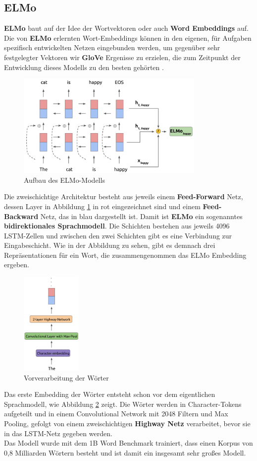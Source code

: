 \subsection{ELMo}
\textbf{ELMo} baut auf der Idee der Wortvektoren oder auch \textbf{Word Embeddings} auf. Die von \textbf{ELMo} erlernten Wort-Embeddings k\"onnen in den eigenen, f\"ur Aufgaben spezifisch entwickelten Netzen eingebunden werden, um gegen\"uber sehr festgelegter Vektoren wir \textbf{GloVe} Ergenisse zu erzielen, die zum Zeitpunkt der Entwicklung dieses Modells zu den besten geh\"orten \cite{elmo}.\\
\begin{figure}[!ht]
\centering
\includegraphics[height=5cm]{pics/elmo_layered_embeddings.png}
\caption{Aufbau des ELMo-Modells \cite{elmoex}}
\label{fig:elmo_layers}
\end{figure}
Die zweischichtige Architektur besteht aus jeweils einem \textbf{Feed-Forward} Netz, dessen Layer in Abbildung \ref{fig:elmo_layers} in rot eingezeichnet sind und einem \textbf{Feed-Backward} Netz, das in blau dargestellt ist. Damit ist \textbf{ELMo} ein sogenanntes \textbf{bidirektionales Sprachmodell}. Die Schichten bestehen aus jeweils 4096 LSTM-Zellen und zwischen den zwei Schichten gibt es eine Verbindung zur Eingabeschicht. Wie in der Abbildung zu sehen, gibt es demnach drei Repr\"asentationen f\"ur ein Wort, die zusammengenommen das ELMo Embedding ergeben.\\
\begin{figure}[!ht]
\centering
\includegraphics[height=5cm]{pics/elmo_character_token.png}
\caption{Vorverarbeitung der W\"orter \cite{elmoex}}
\label{fig:elmo_character}
\end{figure}
Das erste Embedding der W\"orter entsteht schon vor dem eigentlichen Sprachmodell, wie Abbildung \ref{fig:elmo_character} zeigt. Die W\"orter werden in Character-Tokens aufgeteilt und in einem Convolutional Network mit 2048 Filtern und Max Pooling, gefolgt von einem zweischichtigen \textbf{Highway Netz} verarbeitet, bevor sie in das LSTM-Netz gegeben werden.\\
Das Modell wurde mit dem 1B Word Benchmark trainiert, dass einen Korpus von 0,8 Milliarden W\"ortern besteht und ist damit ein insgesamt sehr gro{\ss}es Modell.

